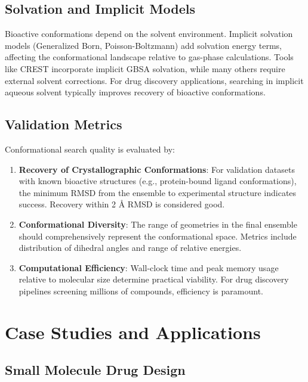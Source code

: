 \documentclass[12pt]{article}
\begin{document}
\subsection{Solvation and Implicit Models}

Bioactive conformations depend on the solvent environment. Implicit solvation models (Generalized Born, Poisson-Boltzmann) add solvation energy terms, affecting the conformational landscape relative to gas-phase calculations. Tools like CREST incorporate implicit GBSA solvation, while many others require external solvent corrections. For drug discovery applications, searching in implicit aqueous solvent typically improves recovery of bioactive conformations.

\subsection{Validation Metrics}

Conformational search quality is evaluated by:

\begin{enumerate}
\item \textbf{Recovery of Crystallographic Conformations}: For validation datasets with known bioactive structures (e.g., protein-bound ligand conformations), the minimum RMSD from the ensemble to experimental structure indicates success. Recovery within 2 Å RMSD is considered good.

\item \textbf{Conformational Diversity}: The range of geometries in the final ensemble should comprehensively represent the conformational space. Metrics include distribution of dihedral angles and range of relative energies.

\item \textbf{Computational Efficiency}: Wall-clock time and peak memory usage relative to molecular size determine practical viability. For drug discovery pipelines screening millions of compounds, efficiency is paramount.
\end{enumerate}

\section{Case Studies and Applications}

\subsection{Small Molecule Drug Design}
\end{document}
